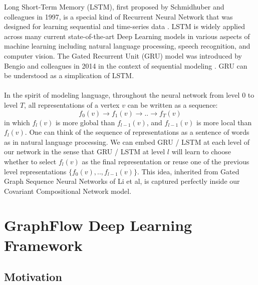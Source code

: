 \documentclass[a4paper]{article}
\begin{document}
Long Short-Term Memory (LSTM), first proposed by Schmidhuber and colleagues in 1997, is a special kind of Recurrent Neural Network that was designed for learning sequential and time-series data \cite{Hochreiter}. LSTM is widely applied across many current state-of-the-art Deep Learning models in various aspects of machine learning including natural language processing, speech recognition, and computer vision. The Gated Recurrent Unit (GRU) model was introduced by Bengio and colleagues in 2014 in the context of sequential modeling \cite{Chung}. GRU can be understood as a simplication of LSTM. \\ \\
In the spirit of modeling language, throughout the neural network from level $0$ to level $T$, all representations of a vertex $v$ can be written as a sequence:
$$f_0(v) \rightarrow f_1(v) \rightarrow .. \rightarrow f_T(v)$$
in which $f_l(v)$ is more global than $f_{l - 1}(v)$, and $f_{l - 1}(v)$ is more local than $f_l(v)$. One can think of the sequence of representations as a sentence of words as in natural language processing. We can embed GRU / LSTM at each level of our network in the sense that GRU / LSTM at level $l$ will learn to choose whether to select $f_l(v)$ as the final representation or reuse one of the previous level representations $\{f_0(v), .., f_{l - 1}(v)\}$. This idea, inherited from Gated Graph Sequence Neural Networks of Li et al\cite{Li}, is captured perfectly inside our Covariant Compositional Network model.

\section{GraphFlow Deep Learning Framework}

\subsection{Motivation}
\end{document}
